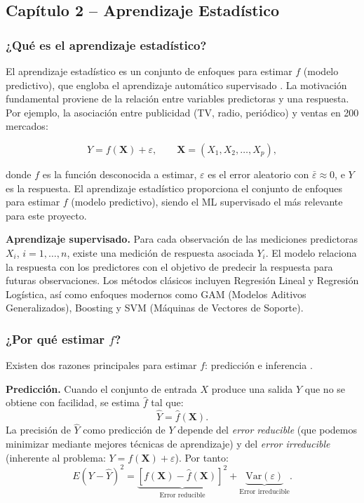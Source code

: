 \documentclass[12pt, a4paper]{article}
\newcommand{\X}{\mathbf{X}}
\begin{document}
\subsection{Capítulo 2 -- Aprendizaje Estadístico}
\label{subsec:cap2}

\subsubsection{¿Qué es el aprendizaje estadístico?}

El aprendizaje estadístico es un conjunto de enfoques para estimar
$f$ (modelo predictivo), que engloba el aprendizaje automático
supervisado \citep[Cap.~2]{islp2023}. La motivación fundamental
proviene de la relación entre variables predictoras y una respuesta.
Por ejemplo, la asociación entre publicidad (TV, radio, periódico)
y ventas en 200 mercados:

\begin{equation}
  Y = f(\X) + \varepsilon,
  \qquad \X = (X_1, X_2, \ldots, X_p),
  \label{eq:modelo_estadistico}
\end{equation}

donde $f$ es la función desconocida a estimar, $\varepsilon$ es el
error aleatorio con $\bar{\varepsilon} \approx 0$, e $Y$ es la
respuesta. El aprendizaje estadístico proporciona el conjunto de
enfoques para estimar $f$ (modelo predictivo), siendo el ML supervisado
el más relevante para este proyecto.

\textbf{Aprendizaje supervisado.} Para cada observación de las
mediciones predictoras $X_i$, $i = 1, \ldots, n$, existe una medición
de respuesta asociada $Y_i$. El modelo relaciona la respuesta con los
predictores con el objetivo de predecir la respuesta para futuras
observaciones. Los métodos clásicos incluyen Regresión Lineal y
Regresión Logística, así como enfoques modernos como GAM (Modelos
Aditivos Generalizados), Boosting y SVM (Máquinas de Vectores de
Soporte).

\subsubsection{¿Por qué estimar \texorpdfstring{$f$}{f}?}

Existen dos razones principales para estimar $f$:
predicción e inferencia \citep[Sec.~2.1]{islp2023}.

\textbf{Predicción.} Cuando el conjunto de entrada $X$ produce una
salida $Y$ que no se obtiene con facilidad, se estima $\hat{f}$ tal
que:
\begin{equation}
  \hat{Y} = \hat{f}(\X).
  \label{eq:prediccion}
\end{equation}
La precisión de $\hat{Y}$ como predicción de $Y$ depende del
\textit{error reducible} (que podemos minimizar mediante mejores
técnicas de aprendizaje) y del \textit{error irreducible} (inherente
al problema: $Y = f(\X) + \varepsilon$). Por tanto:
\begin{equation}
  E(Y - \hat{Y})^2 = \underbrace{[f(\X) - \hat{f}(\X)]^2}_{\text{Error reducible}}
  + \underbrace{\mathrm{Var}(\varepsilon)}_{\text{Error irreducible}}.
  \label{eq:error_descomp}
\end{equation}
\end{document}

